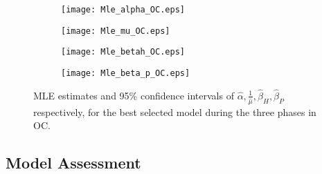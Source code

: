 \documentclass{article}
\begin{document}
\begin{figure}[h]
\begin{subfigure}{.48\textwidth}
  \centering
  \texttt{[image: Mle\_alpha\_OC.eps]}  
  \label{fig5:sub-first}
\end{subfigure}
\begin{subfigure}{.48\textwidth}
  \centering
  \texttt{[image: Mle\_mu\_OC.eps]}  
  \label{fig5:sub-second}
\end{subfigure}

\begin{subfigure}{.48\textwidth}
  \centering
  \texttt{[image: Mle\_betah\_OC.eps]}  
  \label{fig5:sub-third}
\end{subfigure}
\begin{subfigure}{.48\textwidth}
  \centering
  \texttt{[image: Mle\_beta\_p\_OC.eps]}  
  \label{fig5:sub-fourth}
\end{subfigure}
\caption{MLE estimates and 95\% confidence intervals of $\hat{\alpha}, \frac{1}{\hat{\mu}}, \hat{\beta}_{H}, \hat{\beta}_{P}$ respectively, for the best selected model during the three phases in OC.}
\label{fig5}
\end{figure}


\subsection{Model Assessment}
\end{document}
